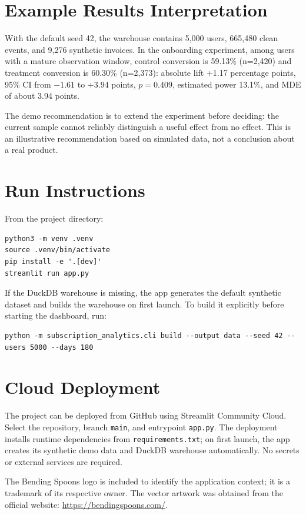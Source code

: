 \documentclass[a4paper,11pt]{article}
\begin{document}
\section{Example Results Interpretation}
With the default seed 42, the warehouse contains 5,000 users, 665,480 clean events, and 9,276 synthetic invoices. In the onboarding experiment, among users with a mature observation window, control conversion is 59.13\% (n=2,420) and treatment conversion is 60.30\% (n=2,373): absolute lift +1.17 percentage points, 95\% CI from $-1.61$ to $+3.94$ points, $p=0.409$, estimated power 13.1\%, and MDE of about 3.94 points.

The demo recommendation is to extend the experiment before deciding: the current sample cannot reliably distinguish a useful effect from no effect. This is an illustrative recommendation based on simulated data, not a conclusion about a real product.

\section{Run Instructions}
From the project directory:
\begin{verbatim}
python3 -m venv .venv
source .venv/bin/activate
pip install -e '.[dev]'
streamlit run app.py
\end{verbatim}
If the DuckDB warehouse is missing, the app generates the default synthetic dataset and builds the warehouse on first launch. To build it explicitly before starting the dashboard, run:
\begin{verbatim}
python -m subscription_analytics.cli build --output data --seed 42 --users 5000 --days 180
\end{verbatim}

\section{Cloud Deployment}
The project can be deployed from GitHub using Streamlit Community Cloud. Select the repository, branch \texttt{main}, and entrypoint \texttt{app.py}. The deployment installs runtime dependencies from \texttt{requirements.txt}; on first launch, the app creates its synthetic demo data and DuckDB warehouse automatically. No secrets or external services are required.

\vfill
\noindent\footnotesize The Bending Spoons logo is included to identify the application context; it is a trademark of its respective owner. The vector artwork was obtained from the official website: \url{https://bendingspoons.com/}.
\end{document}
